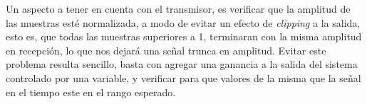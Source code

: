 Un aspecto a tener en cuenta con el transmisor, es verificar que la amplitud de las muestras esté normalizada, a modo de evitar un efecto de \textit{clipping} a la salida, esto es, que todas las muestras superiores a 1, terminaran con la misma amplitud en recepción, lo que nos dejará una señal trunca en amplitud. Evitar este problema resulta sencillo, basta con agregar una ganancia a la salida del sistema controlado por una variable, y verificar para que valores de la misma que la señal en el tiempo este en el rango esperado.